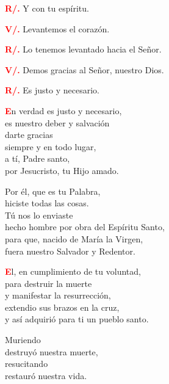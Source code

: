 \documentclass[12pt, letterpaper]{article}
\begin{document}
  \noindent
  \Large {\bfseries \textcolor{red}{R/.}} \hspace{0.5cm} Y con tu esp\'iritu. 

  \noindent
  \Large {\bfseries \textcolor{red}{V/.}} \hspace{0.5cm} Levantemos el coraz\'on.

  \noindent
  \Large {\bfseries \textcolor{red}{R/.}} \hspace{0.5cm} Lo tenemos levantado hacia el Se\~nor. 

  \noindent
  \Large {\bfseries \textcolor{red}{V/.}} \hspace{0.5cm} Demos gracias al Se\~nor, nuestro Dios.

  \noindent
  \Large {\bfseries \textcolor{red}{R/.}} \hspace{0.5cm} Es justo y necesario.

  \clearpage

  \lettrine[lines=2]{\bfseries \textcolor{red}{E}}{}\Large n verdad es justo y necesario,\\
  es nuestro deber y salvaci\'on\\
  darte gracias\\
  siempre y en todo lugar,\\
  a t\'i, Padre santo,\\
  por Jesucristo, tu Hijo amado.

  \noindent
  \Large Por \'el, que es tu Palabra,\\
  hiciste todas las cosas.\\
  T\'u nos lo enviaste\\
  hecho hombre por obra del Esp\'iritu Santo,\\
  para que, nacido de Mar\'ia la Virgen,\\
  fuera nuestro Salvador y Redentor.

  \lettrine[lines=2]{\bfseries \textcolor{red}{E}}{}\Large l, en cumplimiento de tu voluntad,\\
  para destruir la muerte\\
  y manifestar la resurrecci\'on,\\
  extendio sus brazos en la cruz,\\
  y as\'i adquiri\'o para ti un pueblo santo.

  \noindent
  \Large Muriendo\\
  destruy\'o nuestra muerte,\\
  resucitando\\
  restaur\'o nuestra vida.
\end{document}
